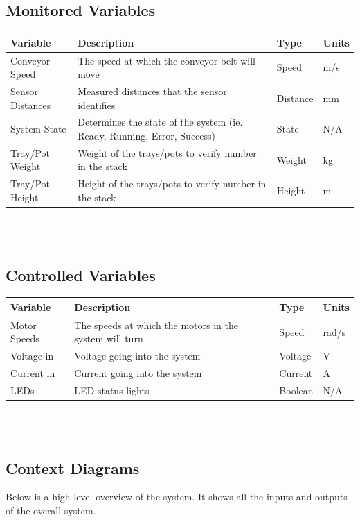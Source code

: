 \documentclass[12pt]{article}
\begin{document}
 \subsection{Monitored Variables}
 \begin{tabular}{ |p{3cm}|p{9cm}|p{2cm}|p{1cm}| }
  \hline
  Variable & Description & Type & Units\\
  \hline
  Conveyor Speed & The speed at which the conveyor belt will move
   & Speed & m/s\\
  \hline
  Sensor Distances & Measured distances that the sensor identifies
   & Distance & mm\\
  \hline
  System State & Determines the state of the system (ie. Ready, Running, Error, Success)
   & State &  N/A\\
  \hline
  Tray/Pot Weight & Weight of the trays/pots to verify number in the stack
   & Weight & kg\\
  \hline
  Tray/Pot Height & Height of the trays/pots to verify number in the stack
   & Height & m\\
  
  \hline
 \end{tabular}\\\\

 \subsection{Controlled Variables}
 \begin{tabular}{ |p{3cm}|p{9cm}|p{2cm}|p{1cm}| }
  \hline
  Variable & Description & Type & Units\\
  \hline
  Motor Speeds & The speeds at which the motors in the system will turn
   & Speed & rad/s\\
  \hline
  Voltage in & Voltage going into the system
   & Voltage & V\\
  \hline
  Current in & Current going into the system
   & Current &  A\\
  \hline
  LEDs & LED status lights
   & Boolean & N/A\\
  
  \hline
 \end{tabular}\\\\

\subsection{Context Diagrams}
Below is a high level overview of the system. It shows all the inputs and outputs
of the overall system.
\end{document}
